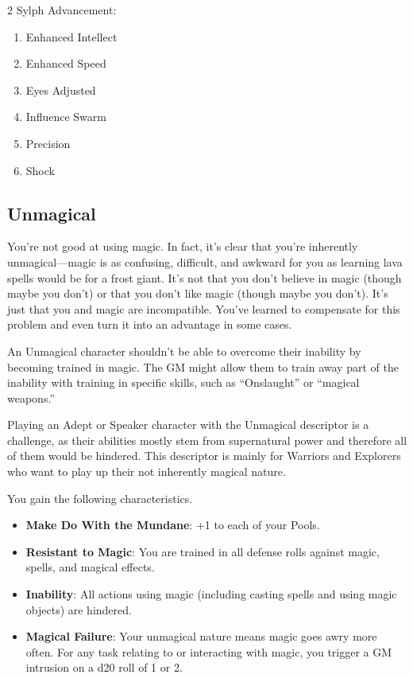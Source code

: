 \begin{multicols}{2}
Sylph Advancement:
\begin{enumerate} 
\item Enhanced Intellect 
\item Enhanced Speed 
\item Eyes Adjusted
\item Influence Swarm 
\item Precision 
\item Shock
\end{enumerate}

\subsection{Unmagical}

You’re not good at using magic. In fact, it’s clear that you’re inherently unmagical—magic is as confusing, difficult, and awkward for you as learning lava spells would be for a frost giant. It’s not that you don’t believe in magic (though maybe you don’t) or that you don’t like magic (though maybe you don’t). It’s just that you and magic are incompatible. You’ve learned to compensate for this problem and even turn it into an advantage in some cases.

An Unmagical character shouldn’t be able to overcome their inability by becoming trained in magic. The GM might allow them to train away part of the inability with training in specific skills, such as “Onslaught” or “magical weapons.”

Playing an Adept or Speaker character with the Unmagical descriptor is a challenge, as their abilities mostly stem from supernatural power and therefore all of them would be hindered. This descriptor is mainly for Warriors and Explorers who want to play up their not inherently magical nature.

You gain the following characteristics.
\begin{itemize}
\item \textbf{Make Do With the Mundane}: +1 to each of your Pools.
\item \textbf{Resistant to Magic}: You are trained in all defense rolls against magic, spells, and magical effects.
\item \textbf{Inability}: All actions using magic (including casting spells and using magic objects) are hindered.
\item \textbf{Magical Failure}: Your unmagical nature means magic goes awry more often. For any task relating to or interacting with magic, you trigger a GM intrusion on a d20 roll of 1 or 2.
\end{itemize}


\end{multicols}
